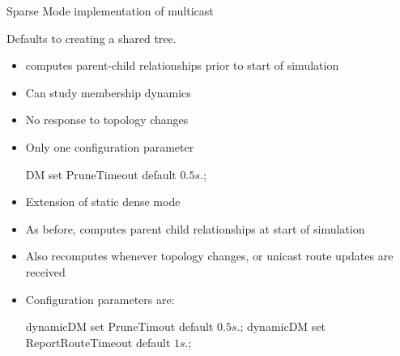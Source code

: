 \documentclass[landscape]{foils}
\begin{document}
\begin{comment}
\item PIM sm mode currently WIP
\item tradeoffs between implementations
\end{comment}

Sparse Mode implementation of multicast


Defaults to creating a shared tree.

\begin{comment}
\item compute-mroutes initialises routing tables at each nodes
\item requires unicast routing sanity
\item can be invoked anytime required; invoked automatically by netdyn
\item switch between shared trees and source specific trees
\item does not capture transience well
\end{comment}

\begin{itemize}
\item computes parent-child relationships prior to start of simulation
\item Can study membership dynamics
\item No response to topology changes
\item Only one configuration parameter
\begin{program}\small
  DM set PruneTimeout  \; default \(0.5s.\);
\end{program}
\end{itemize}

\begin{comment}
\item DVMRP-like 
\item works well in conjunction with static unicast routing
\end{comment}

\begin{itemize}
\item Extension of static dense mode
\item As before, computes parent child relationships at start of simulation
\item Also recomputes whenever topology changes,
  or unicast route updates are received
\item Configuration parameters are:
  \begin{program}\small
    dynamicDM set PruneTimout  \; default \(0.5s.\);
    dynamicDM set ReportRouteTimeout  \; default \(1s.\);
  \end{program}
\end{itemize}
\end{document}
